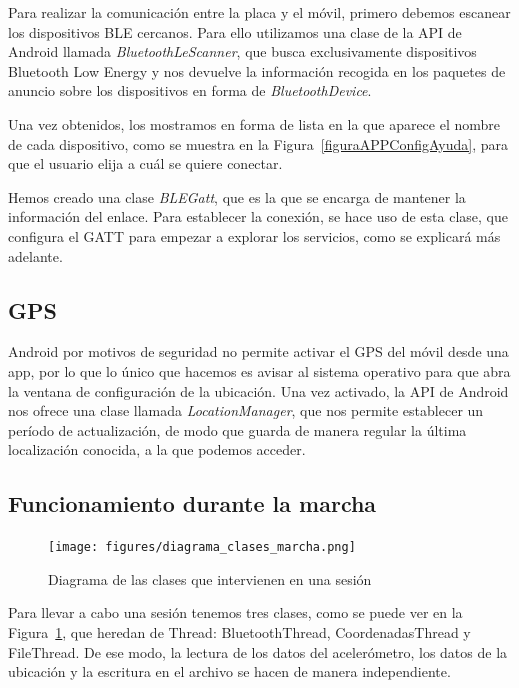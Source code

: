 Para realizar la comunicación entre la placa y el móvil, primero debemos escanear los dispositivos BLE cercanos. Para ello utilizamos una clase de la API de Android llamada \textit{BluetoothLeScanner}, que busca exclusivamente dispositivos Bluetooth Low Energy y nos devuelve la información recogida en los paquetes de anuncio sobre los dispositivos en forma de \textit{BluetoothDevice}.

Una vez obtenidos, los mostramos en forma de lista en la que aparece el nombre de cada dispositivo, como se muestra en la Figura~\ref{figuraAPPConfigAyuda}, para que el usuario elija a cuál se quiere conectar. 

Hemos creado una clase \textit{BLEGatt}, que es la que se encarga de mantener la información del enlace. Para establecer la conexión, se hace uso de esta clase, que configura el GATT para empezar a explorar los servicios, como se explicará más adelante.

\subsection{GPS}
\label{makereference6.2.2}

Android por motivos de seguridad no permite activar el GPS del móvil desde una app, por lo que lo único que hacemos es avisar al sistema operativo para que abra la ventana de configuración de la ubicación.
Una vez activado, la API de Android nos ofrece una clase llamada \textit{LocationManager}, que nos permite establecer un período de actualización, de modo que guarda de manera regular la última localización conocida, a la que podemos acceder.

\subsection{Funcionamiento durante la marcha}
\label{makereference6.2.3}

\begin{figure}[h]%
  \centering
    \texttt{[image: figures/diagrama\_clases\_marcha.png]} %
    \caption[Diagrama de las clases que intervienen en una sesión]{Diagrama de las clases que intervienen en una sesión}
    \label{figuraDiagramaClasesMarcha}
\end{figure}

Para llevar a cabo una sesión tenemos tres clases, como se puede ver en la Figura~\ref{figuraDiagramaClasesMarcha}, que heredan de Thread: BluetoothThread, CoordenadasThread y FileThread. De ese modo, la lectura de los datos del acelerómetro, los datos de la ubicación y la escritura en el archivo se hacen de manera independiente.\\

